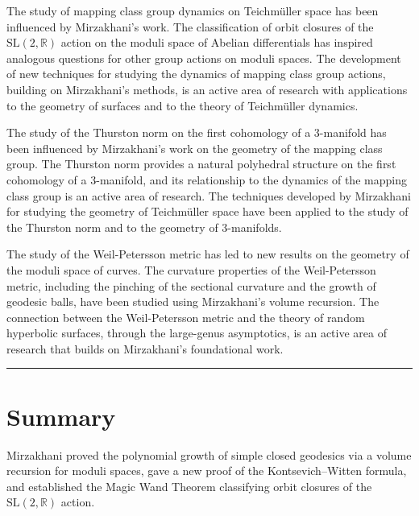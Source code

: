 The study of mapping class group dynamics on Teichm\"uller space has been influenced by Mirzakhani's work. The classification of orbit closures of the $\mathrm{SL}(2,\mathbb{R})$ action on the moduli space of Abelian differentials has inspired analogous questions for other group actions on moduli spaces. The development of new techniques for studying the dynamics of mapping class group actions, building on Mirzakhani's methods, is an active area of research with applications to the geometry of surfaces and to the theory of Teichm\"uller dynamics.

The study of the Thurston norm on the first cohomology of a 3-manifold has been influenced by Mirzakhani's work on the geometry of the mapping class group. The Thurston norm provides a natural polyhedral structure on the first cohomology of a 3-manifold, and its relationship to the dynamics of the mapping class group is an active area of research. The techniques developed by Mirzakhani for studying the geometry of Teichm\"uller space have been applied to the study of the Thurston norm and to the geometry of 3-manifolds.

The study of the Weil-Petersson metric has led to new results on the geometry of the moduli space of curves. The curvature properties of the Weil-Petersson metric, including the pinching of the sectional curvature and the growth of geodesic balls, have been studied using Mirzakhani's volume recursion. The connection between the Weil-Petersson metric and the theory of random hyperbolic surfaces, through the large-genus asymptotics, is an active area of research that builds on Mirzakhani's foundational work.

\begin{center}\rule{0.5\linewidth}{0.5pt}\end{center}

\section*{Summary}

Mirzakhani proved the polynomial growth of simple closed geodesics via a volume recursion for moduli spaces, gave a new proof of the Kontsevich--Witten formula, and established the Magic Wand Theorem classifying orbit closures of the $\mathrm{SL}(2,\mathbb{R})$ action.
